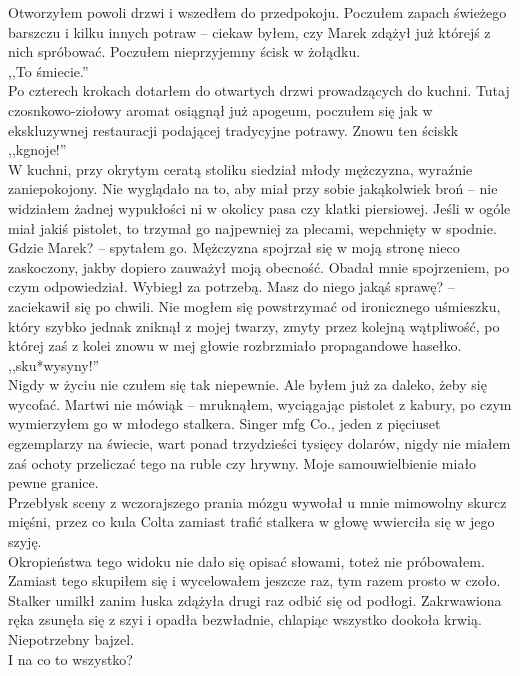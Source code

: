 \documentclass[../MAIN.tex]{subfiles}
\begin{document}
Otworzyłem powoli drzwi i wszedłem do przedpokoju. Poczułem zapach świeżego barszczu i kilku innych potraw -- ciekaw byłem, czy Marek zdążył już którejś z nich spróbować. Poczułem nieprzyjemny ścisk w żołądku.\\
,,To śmiecie.''\\
Po czterech krokach dotarłem do otwartych drzwi prowadzących do kuchni. Tutaj czosnkowo-ziołowy aromat osiągnął już apogeum, poczułem się jak w ekskluzywnej restauracji podającej tradycyjne potrawy. Znowu ten ścisk\3k\\
,,\3kgnoje!''\\
W kuchni, przy okrytym ceratą stoliku siedział młody mężczyzna, wyraźnie zaniepokojony. Nie wyglądało na to, aby miał przy sobie jakąkolwiek broń -- nie widziałem żadnej wypukłości ni w okolicy pasa czy klatki piersiowej. Jeśli w ogóle miał jakiś pistolet, to trzymał go najpewniej za plecami, wepchnięty w spodnie.
\sx Gdzie Marek? -- spytałem go.
\qd
Mężczyzna spojrzał się w moją stronę nieco zaskoczony, jakby dopiero zauważył moją obecność. Obadał mnie spojrzeniem, po czym odpowiedział.
\sx Wybiegł za potrzebą. Masz do niego jakąś sprawę? -- zaciekawił się po chwili.
\qd
Nie mogłem się powstrzymać od ironicznego uśmieszku, który szybko jednak zniknął z mojej twarzy, zmyty przez kolejną wątpliwość, po której zaś z kolei znowu w mej głowie rozbrzmiało propagandowe hasełko.\\
,,sku*wysyny!''\\
Nigdy w życiu nie czułem się tak niepewnie. Ale byłem już za daleko, żeby się wycofać.
\sx Martwi nie mówią\3k -- mruknąłem, wyciągając pistolet z kabury, po czym wymierzyłem go w młodego stalkera.
\qd
Singer mfg Co., jeden z pięciuset egzemplarzy na świecie, wart ponad trzydzieści tysięcy dolarów, nigdy nie miałem zaś ochoty przeliczać tego na ruble czy hrywny. Moje samouwielbienie miało pewne granice.\\
Przebłysk sceny z wczorajszego prania mózgu wywołał u mnie mimowolny skurcz mięśni, przez co kula Colta zamiast trafić stalkera w głowę wwierciła się w jego szyję.\\
Okropieństwa tego widoku nie dało się opisać słowami, toteż nie próbowałem. Zamiast tego skupiłem się i wycelowałem jeszcze raz, tym razem prosto w czoło.\\
Stalker umilkł zanim łuska zdążyła drugi raz odbić się od podłogi. Zakrwawiona ręka zsunęła się z szyi i opadła bezwładnie, chlapiąc wszystko dookoła krwią. Niepotrzebny bajzel.\\
I na co to wszystko?\\
\end{document}
